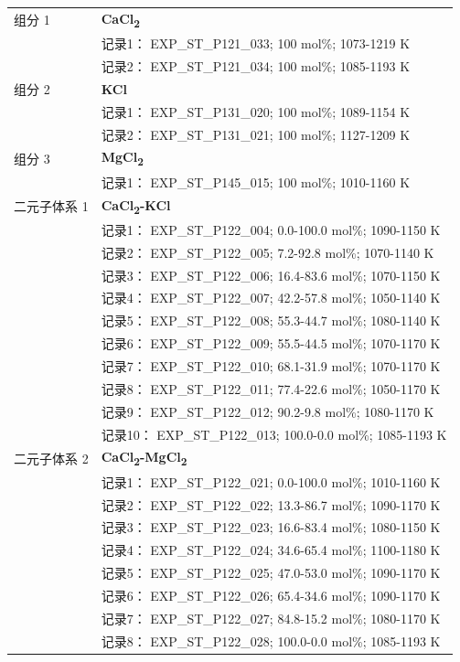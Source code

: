 \documentclass[12pt]{article}
\begin{document}
{\begin{longtable}[]{@{}
  >{\raggedright\arraybackslash}p{}
  >{\raggedright\arraybackslash}p{}@{}}
组分 1  & \textbf{CaCl\textsubscript{2}} \\
 & 记录1： EXP\_ST\_P121\_033; 100 mol\%; 1073-1219 K \\
 & 记录2： EXP\_ST\_P121\_034; 100 mol\%; 1085-1193 K  \\

组分 2  & \textbf{KCl} \\
 & 记录1： EXP\_ST\_P131\_020; 100 mol\%; 1089-1154 K \\
 & 记录2： EXP\_ST\_P131\_021; 100 mol\%; 1127-1209 K  \\

组分 3  & \textbf{MgCl\textsubscript{2}} \\
 & 记录1： EXP\_ST\_P145\_015; 100 mol\%; 1010-1160 K  \\

二元子体系 1  & \textbf{CaCl\textsubscript{2}-KCl} \\
 & 记录1： EXP\_ST\_P122\_004; 0.0-100.0 mol\%; 1090-1150 K \\
 & 记录2： EXP\_ST\_P122\_005; 7.2-92.8 mol\%; 1070-1140 K \\
 & 记录3： EXP\_ST\_P122\_006; 16.4-83.6 mol\%; 1070-1150 K \\
 & 记录4： EXP\_ST\_P122\_007; 42.2-57.8 mol\%; 1050-1140 K \\
 & 记录5： EXP\_ST\_P122\_008; 55.3-44.7 mol\%; 1080-1140 K \\
 & 记录6： EXP\_ST\_P122\_009; 55.5-44.5 mol\%; 1070-1170 K \\
 & 记录7： EXP\_ST\_P122\_010; 68.1-31.9 mol\%; 1070-1170 K \\
 & 记录8： EXP\_ST\_P122\_011; 77.4-22.6 mol\%; 1050-1170 K \\
 & 记录9： EXP\_ST\_P122\_012; 90.2-9.8 mol\%; 1080-1170 K \\
 & 记录10： EXP\_ST\_P122\_013; 100.0-0.0 mol\%; 1085-1193 K  \\

二元子体系 2  & \textbf{CaCl\textsubscript{2}-MgCl\textsubscript{2}} \\
 & 记录1： EXP\_ST\_P122\_021; 0.0-100.0 mol\%; 1010-1160 K \\
 & 记录2： EXP\_ST\_P122\_022; 13.3-86.7 mol\%; 1090-1170 K \\
 & 记录3： EXP\_ST\_P122\_023; 16.6-83.4 mol\%; 1080-1150 K \\
 & 记录4： EXP\_ST\_P122\_024; 34.6-65.4 mol\%; 1100-1180 K \\
 & 记录5： EXP\_ST\_P122\_025; 47.0-53.0 mol\%; 1090-1170 K \\
 & 记录6： EXP\_ST\_P122\_026; 65.4-34.6 mol\%; 1090-1170 K \\
 & 记录7： EXP\_ST\_P122\_027; 84.8-15.2 mol\%; 1080-1170 K \\
 & 记录8： EXP\_ST\_P122\_028; 100.0-0.0 mol\%; 1085-1193 K  \\


\end{longtable}}
\end{document}
